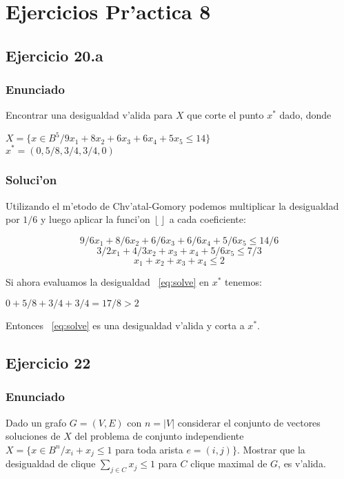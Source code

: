 \section{Ejercicios Pr'actica 8}
\subsection{Ejercicio 20.a}
\subsubsection{Enunciado}
Encontrar una desigualdad v'alida para $X$ que corte el punto $x^{*}$ dado, donde
\begin{center}
$X = \{x \in B^{5} / 9x_1 + 8x_2 + 6x_3 + 6x_4 + 5x_5 \leq 14\}$ \\
$x^{*} = (0, 5/8, 3/4, 3/4, 0)$
\end{center}
\subsubsection{Soluci'on}
Utilizando el m'etodo de Chv'atal-Gomory podemos multiplicar la desigualdad por $1/6$ y luego aplicar la funci'on $\left \lfloor{}\right \rfloor$ a cada coeficiente:
\begin{center}
\begin{equation}
9/6 x_1 + 8/6 x_2 + 6/6 x_3 + 6/6 x_4 + 5/6 x_5 \leq 14/6
\end{equation}
\begin{equation}
3/2 x_1 + 4/3 x_2 + x_3 + x_4 + 5/6 x_5 \leq 7/3
\end{equation}
\begin{equation} \label{eq:solve}
x_1 + x_2 + x_3 + x_4 \leq 2
\end{equation}
\end{center}
Si ahora evaluamos la desigualdad ~\ref{eq:solve} en $x^{*}$ tenemos:
\begin{center}
$0 + 5/8 + 3/4 + 3/4 = 17/8 > 2$
\end{center}
Entonces ~\ref{eq:solve} es una desigualdad v'alida y corta a $x^{*}$.

\subsection{Ejercicio 22}
\subsubsection{Enunciado}
Dado un grafo $G = (V, E)$ con $n = |V|$ considerar el conjunto de vectores soluciones de $X$ del
problema de conjunto independiente $X = \{ x\in B^{n}/ x_{i}+x_{j}\leq 1$ para toda arista $e =(i,j) \}$. Mostrar que la desigualdad de clique $\sum_{j\in C} x_{j} \leq 1$ para $C$ clique maximal de $G$, es v'alida. 
